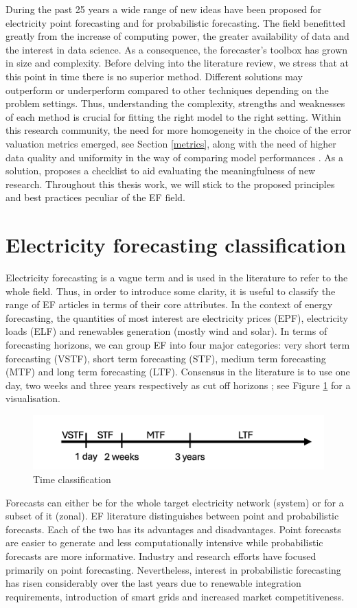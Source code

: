During the past 25 years a wide range of new ideas have been proposed for electricity point forecasting and for probabilistic forecasting. The field benefitted greatly from the increase of computing power, the greater availability of data and the interest in data science. As a consequence, the forecaster's toolbox has grown in size and complexity. Before delving into the literature review, we stress that at this point in time there is no superior method. Different solutions may outperform or underperform compared to other techniques depending on the problem settings. Thus, understanding the complexity, strengths and weaknesses of each method is crucial for fitting the right model to the right setting. Within this research community, the need for more homogeneity in the choice of the error valuation metrics emerged, see Section \ref{metrics}, along with the need of higher data quality and uniformity in the way of comparing model performances \cite{EPF_review}. As a solution, \cite{lago} proposes a checklist to aid evaluating the meaningfulness of new research. Throughout this thesis work, we will stick to the proposed principles and best practices peculiar of the EF field.

\section{Electricity forecasting classification}
Electricity forecasting is a vague term and is used in the literature to refer to the whole field. Thus, in order to introduce some clarity, it is useful to classify the range of EF articles in terms of their core attributes.
In the context of energy forecasting, the quantities of most interest are electricity prices (EPF), electricity loads (ELF) and renewables generation (mostly wind and solar).
In terms of forecasting horizons, we can group EF into four major categories: very short term forecasting (VSTF), short term forecasting (STF), medium term forecasting (MTF) and long term forecasting (LTF). Consensus in the literature is to use one day, two weeks and three years respectively as cut off horizons \cite{hong_phd}; see Figure \ref{fig:time} for a visualisation. 
\begin{figure}
  \includegraphics[width=\textwidth]{images/time_2.png}
  \caption{Time classification \cite{prob_elf}}
  \label{fig:time}
\end{figure}
Forecasts can either be for the whole target electricity network (system) or for a subset of it (zonal).
EF literature distinguishes between point and probabilistic forecasts. Each of the two has its advantages and disadvantages. Point forecasts are easier to generate and less computationally intensive while probabilistic forecasts are more informative. Industry and research efforts have focused primarily on point forecasting. Nevertheless, interest in probabilistic forecasting has risen considerably over the last years due to renewable integration requirements, introduction of smart grids and increased market competitiveness.
